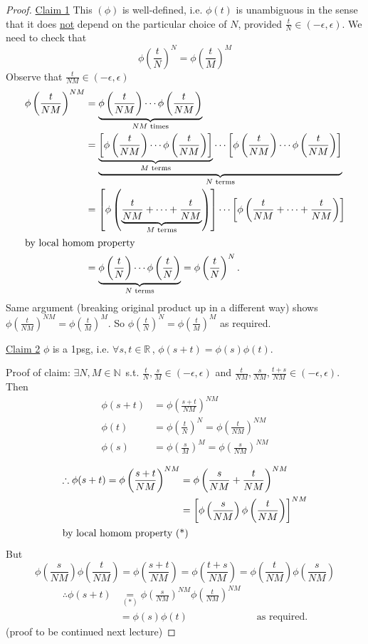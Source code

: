 \documentclass[12pt,a4paper]{article}
\newcommand{\nN}{\ensuremath{\mathbb{N}\,}}
\newcommand{\rR}{\ensuremath{\mathbb{R}\,}}
\newcommand{\ul}[1]{\underline{#1}}
\begin{document}
\begin{proof}
\ul{Claim 1} This $(\phi)$ is well-defined, i.e. $\phi(t)$ is unambiguous in the sense that it does \ul{not} depend on the particular choice of $N$, provided $\frac{t}{N}\in  (-\epsilon,\epsilon)$. We need to check that 
\[\phi\left(\frac{t}{N}\right)^N=\phi\left(\frac{t}{M}\right)^M\]
Observe that $\frac{t}{NM}\in (-\epsilon,\epsilon)$
\begin{align*}
\phi\left(\frac{t}{NM}\right)^{NM}&=\underbrace{\phi\left(\frac{t}{NM}\right)\cdots \phi\left(\frac{t}{NM}\right)}_{NM \text{ times}}\\
&=\underbrace{\underbrace{\left[\phi\left(\frac{t}{NM}\right)\cdots \phi\left(\frac{t}{NM}\right)\right]}_{M \text{ terms}}\cdots \left[\phi\left(\frac{t}{NM}\right)\cdots \phi\left(\frac{t}{NM}\right)\right]}_{N \text{ terms}}\\
&=\left[\phi\left(\underbrace{\frac{t}{NM}+\cdots+\frac{t}{NM}}_{M \text{ terms}}\right)\right]\cdots \left[\phi\left(\frac{t}{NM}+\cdots+\frac{t}{NM}\right)\right] \\
\shortintertext{\raggedleft by local homom property}
&=\underbrace{\phi\left(\frac{t}{N}\right)\cdots \phi\left(\frac{t}{N}\right)}_{N \text{ terms}} = \phi\left(\frac{t}{N}\right)^N.
\end{align*}
Same argument (breaking original product up in a different way) shows $\phi\left(\frac{t}{NM}\right)^{NM}=\phi\left(\frac{t}{M}\right)^M$. So $\phi\left(\frac{t}{N}\right)^N=\phi\left(\frac{t}{M}\right)^M$ as required.

\ul{Claim 2} $\phi$ is a 1psg, i.e. $\forall s,t \in \rR$, $\phi(s+t)=\phi(s)\phi(t)$. 

Proof of claim: $\exists N, M\in \nN$ s.t. $\frac{t}{N}, \frac{s}{M}\in (-\epsilon,\epsilon)$ and $\frac{t}{NM}, \frac{s}{NM}, \frac{t+s}{NM}\in (-\epsilon,\epsilon)$.
Then 
\begin{align*}
\phi(s+t)&=\phi\left(\frac{s+t}{NM}\right)^{NM}\\
\phi(t)&=\phi\left(\frac{t}{N}\right)^{N}=\phi\left(\frac{t}{NM}\right)^{NM}\\
\phi(s)&=\phi\left(\frac{s}{M}\right)^{M}=\phi\left(\frac{s}{NM}\right)^{NM}
\end{align*}

\begin{align*}
\therefore \phi(s+t)=\phi\left(\frac{s+t}{NM}\right)^{NM}&=\phi\left(\frac{s}{NM}+\frac{t}{NM}\right)^{NM}\\
&=\left[\phi\left(\frac{s}{NM}\right)\phi\left(\frac{t}{NM}\right)\right]^{NM}\\
\shortintertext{\raggedleft by local homom property (*)}
\end{align*}
But
\[\phi\left(\frac{s}{NM}\right)\phi\left(\frac{t}{NM}\right)=\phi\left(\frac{s+t}{NM}\right)=\phi\left(\frac{t+s}{NM}\right)=\phi\left(\frac{t}{NM}\right)\phi\left(\frac{s}{NM}\right)\]
\begin{align*}
\therefore \phi(s+t)&\underset{(*)}{=}\phi\left(\frac{s}{NM}\right)^{NM}\phi\left(\frac{t}{NM}\right)^{NM}\\
&=\phi(s)\phi(t) && \text{as required.}
\end{align*}
(proof to be continued next lecture)
\end{proof}
\end{document}
